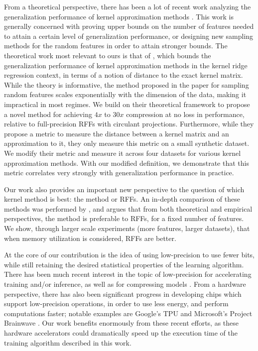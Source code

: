 From a theoretical perspective, there has been a lot of recent work analyzing the generalization performance of kernel approximation methods \citep{bach13,alaoui15,rudi15,optrff15,musco17,rudi17,bach17,avron17}. This work is generally concerned with proving upper bounds on the number of features needed to attain a certain level of generalization performance, or designing new sampling methods for the random features in order to attain stronger bounds. The theoretical work most relevant to ours is that of \citet{avron17}, which bounds the generalization performance of kernel approximation methods in the kernel ridge regression context, in terms of a notion of distance to the exact kernel matrix.  While the theory is informative, the method proposed in the paper for sampling random features scales exponentially with the dimension of the data, making it impractical in most regimes. We build on their theoretical framework to propose a novel method for achieving $4x$ to $30x$ compression at no loss in performance, relative to full-precision RFFs with circulant projections. Furthermore, while they propose a metric to measure the distance between a kernel matrix and an approximation to it, they only measure this metric on a small synthetic dataset. We modify their metric and measure it across four datasets for various kernel approximation methods. With our modified definition, we demonstrate that this metric correlates very strongly with generalization performance in practice.

Our work also provides an important new perspective to the question of which kernel method is best: the \Nystrom method or RFFs. An in-depth comparison of these methods was performed by \citet{nysvsrff12}, and argues that from both theoretical and empirical perspectives, the \Nystrom method is preferable to RFFs, for a fixed number of features. We show, through larger scale experiments (more features, larger datasets), that when memory utilization is considered, RFFs are better.

At the core of our contribution is the idea of using low-precision to use fewer bits, while still retaining the desired statistical properties of the learning algorithm.  There has been much recent interest in the topic of low-precision for accelerating training and/or inference, as well as for compressing models \citep{gupta15,hogwild15,hubara16,halp18,desa17,han15}.  From a hardware perspective, there has also been significant progress in developing chips which support low-precision operations, in order to use less energy, and perform computations faster; notable examples are Google's TPU \citep{tpu17} and Microsoft's Project Brainwave \citep{brainwave17}. Our work benefits enormously from these recent efforts, as these hardware accelerators could dramatically speed up the execution time of the training algorithm described in this work.
